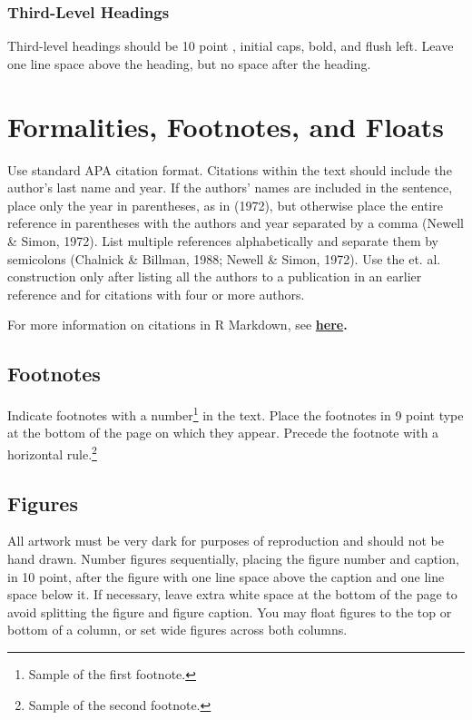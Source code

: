 \documentclass[10pt, letterpaper]{article}
\begin{document}
\subsubsection{Third-Level Headings}\label{third-level-headings}

Third-level headings should be 10 point , initial caps, bold, and flush
left. Leave one line space above the heading, but no space after the
heading.

\section{Formalities, Footnotes, and
Floats}\label{formalities-footnotes-and-floats}

Use standard APA citation format. Citations within the text should
include the author's last name and year. If the authors' names are
included in the sentence, place only the year in parentheses, as in
(1972), but otherwise place the entire reference in parentheses with the
authors and year separated by a comma (Newell \& Simon, 1972). List
multiple references alphabetically and separate them by semicolons
(Chalnick \& Billman, 1988; Newell \& Simon, 1972). Use the et. al.
construction only after listing all the authors to a publication in an
earlier reference and for citations with four or more authors.

For more information on citations in R Markdown, see
\textbf{\href{http://rmarkdown.rstudio.com/authoring_bibliographies_and_citations.html\#citations}{here}.}

\subsection{Footnotes}\label{footnotes}

Indicate footnotes with a number\footnote{Sample of the first
footnote.} in the text. Place the footnotes in 9 point type at the
bottom of the page on which they appear. Precede the footnote with a
horizontal rule.\footnote{Sample of the second footnote.}

\subsection{Figures}\label{figures}

All artwork must be very dark for purposes of reproduction and should
not be hand drawn. Number figures sequentially, placing the figure
number and caption, in 10 point, after the figure with one line space
above the caption and one line space below it. If necessary, leave extra
white space at the bottom of the page to avoid splitting the figure and
figure caption. You may float figures to the top or bottom of a column,
or set wide figures across both columns.
\end{document}
